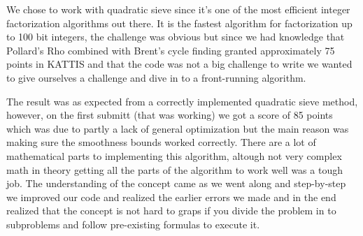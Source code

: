 We chose to work with quadratic sieve since it's one of the most efficient integer factorization algorithms out there. It is the fastest algorithm for factorization up to 100 bit integers, the challenge was obvious but since we had knowledge that Pollard's Rho combined with Brent's cycle finding granted approximately 75 points in KATTIS and that the code was not a big challenge to write we wanted to give ourselves a challenge and dive in to a front-running algorithm.

The result was as expected from a correctly implemented quadratic sieve method, however, on the first submitt (that was working) we got a score of 85 points which was due to partly a lack of general optimization but the main reason was making sure the smoothness bounds worked correctly. There are a lot of mathematical parts to implementing this algorithm, altough not very complex math in theory getting all the parts of the algorithm to work well was a tough job. The understanding of the concept came as we went along and step-by-step we improved our code and realized the earlier errors we made and in the end realized that the concept is not hard to graps if you divide the problem in to subproblems and follow pre-existing formulas to execute it.